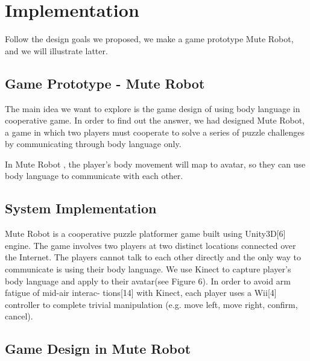 \documentclass{sigchi}
\begin{document}
\section{Implementation}

Follow the design goals we proposed, we make a game prototype Mute Robot, and we will illustrate latter.

\subsection{Game Prototype - Mute Robot}

The main idea we want to explore is the game design of using body language in cooperative game. In order to find out the answer, we had designed Mute Robot, a game in which two players must cooperate to solve a series of puzzle challenges by communicating through body language only.
          
In Mute Robot , the player’s body movement will map to avatar, so they can use body language to communicate with each other.

\subsection{System Implementation}

Mute Robot is a cooperative puzzle platformer game built using Unity3D[6] engine. The game involves two players at two distinct locations connected over the Internet. The players cannot talk to each other directly and the only way to communicate is using their body language. We use Kinect to capture player’s body language and apply to their avatar(see Figure 6). In order to avoid arm fatigue of mid-air interac- tions[14] with Kinect, each player uses a Wii[4] controller to complete trivial manipulation (e.g. move left, move right, confirm, cancel).  

\subsection{Game Design in Mute Robot}
\end{document}
